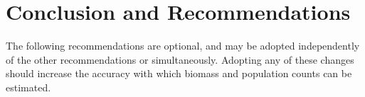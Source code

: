 \documentclass[11pt]{article} %
\begin{document}

\section{Conclusion and Recommendations}

The following recommendations are optional, and may be adopted independently of 
the other recommendations or simultaneously. Adopting any of these changes 
should increase the accuracy with which biomass and population counts can be 
estimated.
\end{document}
